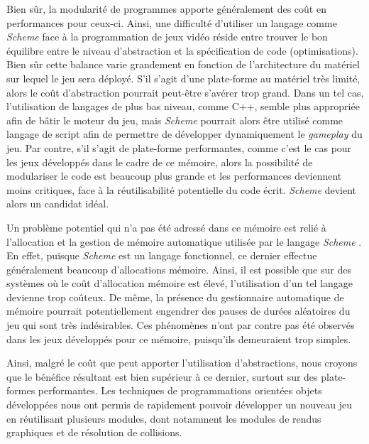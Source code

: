 \documentclass[12pt,twoside,letterpaper,francais]{book}
\newcommand{\Schemelang}{{\textit{Scheme }}}
\begin{document}
Bien sûr, la modularité de programmes apporte généralement des coût en
performances pour ceux-ci. Ainsi, une difficulté d'utiliser un langage
comme \Schemelang face à la programmation de jeux vidéo réside entre
trouver le bon équilibre entre le niveau d'abstraction et la
spécification de code (optimisations). Bien sûr cette balance varie
grandement en fonction de l'architecture du matériel sur lequel le jeu
sera déployé. S'il s'agit d'une plate-forme au matériel très limité,
alors le coût d'abstraction pourrait peut-être s'avérer trop
grand. Dans un tel cas, l'utilisation de langages de plus bas niveau,
comme C++, semble plus appropriée afin de bâtir le moteur du jeu, mais
\Schemelang pourrait alors être utilisé comme langage de script afin de
permettre de développer dynamiquement le \textit{gameplay} du jeu. Par
contre, s'il s'agit de plate-forme performantes, comme c'est le cas
pour les jeux développés dans le cadre de ce mémoire, alors la
possibilité de modulariser le code est beaucoup plus grande et les
performances deviennent moins critiques, face à la réutilisabilité
potentielle du code écrit. \Schemelang devient alors un candidat idéal.

Un problème potentiel qui n'a pas été adressé dans ce mémoire est
relié à l'allocation et la gestion de mémoire automatique utilisée par
le langage \Schemelang. En effet, puisque \Schemelang est un langage
fonctionnel, ce dernier effectue généralement beaucoup d'allocations
mémoire. Ainsi, il est possible que sur des systèmes où le coût
d'allocation mémoire est élevé, l'utilisation d'un tel langage
devienne trop coûteux. De même, la présence du gestionnaire
automatique de mémoire pourrait potentiellement engendrer des pauses
de durées aléatoires du jeu qui sont très indésirables. Ces phénomènes
n'ont par contre pas été observés dans les jeux développés pour ce
mémoire, puisqu'ils demeuraient trop simples.

Ainsi, malgré le coût que peut apporter l'utilisation d'abstractions,
nous croyons que le bénéfice résultant est bien supérieur à ce
dernier, surtout sur des plate-formes performantes. Les techniques de
programmations orientées objets développées nous ont permis de
rapidement pouvoir développer un nouveau jeu en réutilisant plusieurs
modules, dont notamment les modules de rendus graphiques et de
résolution de collisions.




\end{document}
